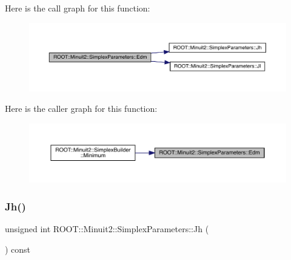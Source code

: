 Here is the call graph for this function\+:
\nopagebreak
\begin{figure}[H]
\begin{center}
\leavevmode
\includegraphics[width=350pt]{d7/da2/classROOT_1_1Minuit2_1_1SimplexParameters_ad71f372dd3873cbf351dc8eddc3a9c9a_cgraph}
\end{center}
\end{figure}
Here is the caller graph for this function\+:
\nopagebreak
\begin{figure}[H]
\begin{center}
\leavevmode
\includegraphics[width=350pt]{d7/da2/classROOT_1_1Minuit2_1_1SimplexParameters_ad71f372dd3873cbf351dc8eddc3a9c9a_icgraph}
\end{center}
\end{figure}
\mbox{\label{classROOT_1_1Minuit2_1_1SimplexParameters_a54250c0d286fcf4d6bbb45df037c7d85}} 
\subsubsection{\texorpdfstring{Jh()}{Jh()}\hspace{0.1cm}{\footnotesize\ttfamily [1/3]}}
{\footnotesize\ttfamily unsigned int R\+O\+O\+T\+::\+Minuit2\+::\+Simplex\+Parameters\+::\+Jh (\begin{DoxyParamCaption}{ }\end{DoxyParamCaption}) const\hspace{0.3cm}{\ttfamily [inline]}}

\mbox{\label{classROOT_1_1Minuit2_1_1SimplexParameters_a54250c0d286fcf4d6bbb45df037c7d85}} 
